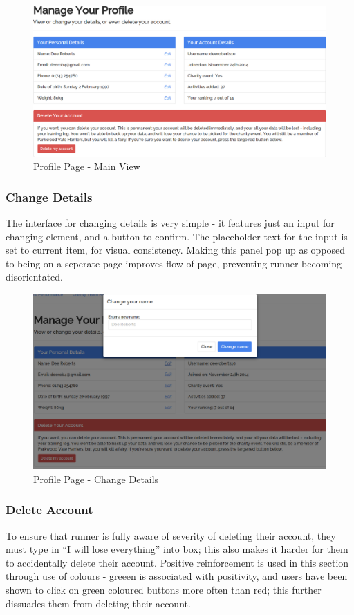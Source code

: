 \documentclass{article}[12pt,a4paper]
\begin{document}
\begin{figure}[h!]
  \includegraphics[scale=0.35]{final_ui/profile}
  \caption{Profile Page - Main View}
\end{figure}
\clearpage

\subsubsection{Change Details}
The interface for changing details is very simple - it features just an input for changing element, and a button to confirm. The placeholder text for the input is set to current item, for visual consistency. Making this panel pop up as opposed to being on a seperate page improves flow of page, preventing runner becoming disorientated.

\begin{figure}[h!]
  \includegraphics[scale=0.35]{final_ui/profile_change}
  \caption{Profile Page - Change Details}
\end{figure}
\clearpage

\subsubsection{Delete Account}
To ensure that runner is fully aware of severity of deleting their account, they must type in ``I will lose everything'' into box; this also makes it harder for them to accidentally delete their account. Positive reinforcement is used in this section through use of colours - greeen is associated with positivity, and users have been shown to click on green coloured buttons more often than red; this further dissuades them from deleting their account.
\end{document}
